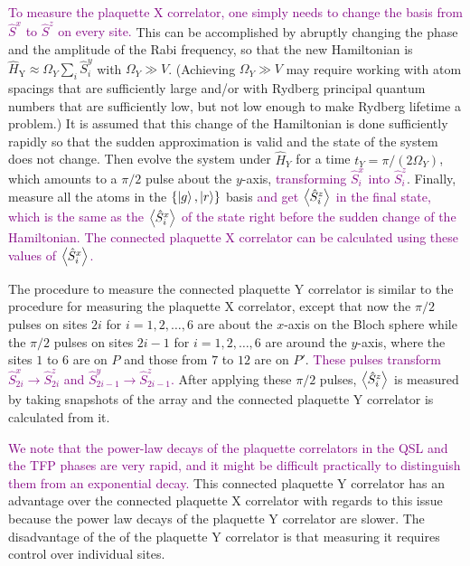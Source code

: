 \documentclass[twocolumn,superscriptaddress,amsmath,amssymb,aps,prx,nofootinbib]{revtex4-2}
\newcommand{\newtext}[1]{\textcolor{purple}{#1}}
\begin{document}
\newtext{To measure the plaquette X correlator, one simply needs to change the basis from $\hat{S}^x$ to $\hat{S}^z$ on every site.} 
This can be accomplished by abruptly changing the phase and the amplitude of the Rabi frequency, so that the new Hamiltonian is $\hat{H}_\text{Y} \approx \Omega_Y \sum_i \hat{S}^y_i$ with $\Omega_Y \gg V$. 
(Achieving $\Omega_Y \gg V$ may require working with atom spacings that are sufficiently large and/or with Rydberg principal quantum numbers that are sufficiently low, but not low enough to make Rydberg lifetime a problem.) 
It is assumed that this change of the Hamiltonian is done sufficiently rapidly so that the sudden approximation is valid and the state of the system does not change.
Then evolve the system under $\hat{H}_Y$ for a time  $t_Y = \pi/(2 \Omega_Y)$, which amounts to a $\pi/2$ pulse about the $y$-axis,  \newtext{transforming $\hat{S}^x_i$ into $\hat{S}^z_i$}. 
Finally, measure all the atoms in the $\{\ket{g},\ket{r}\}$ basis \newtext{and get $\expval{ \hat{S}^z_i}$ in the final state, which is the same as the $\expval{ \hat{S}^x_i}$ of the state right before the sudden change of the Hamiltonian.
The connected plaquette X correlator can be calculated using these values of $\expval{\hat{S}_i^x}$.} 

The procedure to measure the connected plaquette Y correlator is similar to the procedure for measuring the plaquette X correlator, except that now the $\pi/2$ pulses on sites  $2i$ for $i= 1,2,\ldots,6$ are about the $x$-axis on the Bloch sphere while the $\pi/2$ pulses on  sites $2i-1$ for $i=1,2,\ldots,6$ are around the $y$-axis, where the sites $1$ to $6$ are on $P$ and those from $7$ to $12$ are on $P'$. 
\newtext{These pulses transform $\hat{S}_{2i}^{x} \rightarrow \hat{S}^{z}_{2i}$ and $\hat{S}_{2i-1}^{y} \rightarrow \hat{S}^{z}_{2i-1}$.}
After applying these $\pi/2$ pulses, $\expval{ \hat{S}_i^z}$ is measured by taking snapshots of the array and the connected plaquette Y correlator is calculated from it.

\newtext{We note that the power-law decays of the plaquette correlators in the QSL and the TFP phases are very rapid, and it might be difficult practically to distinguish them from an exponential decay.}
This connected plaquette Y correlator has an advantage over the connected plaquette X correlator with regards to this issue because the power law decays of the plaquette Y correlator are slower. The disadvantage of the of the plaquette Y correlator is that measuring it requires control over individual sites.
\end{document}
